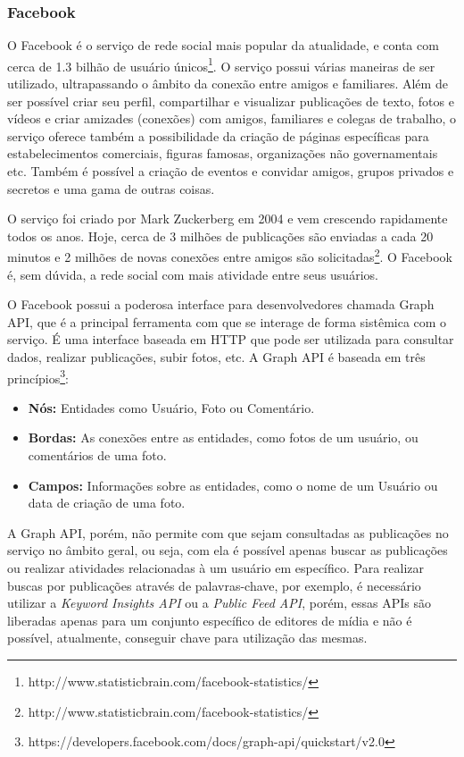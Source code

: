 \subsubsection*{Facebook}

O Facebook é o serviço de rede social mais popular da atualidade, e conta com cerca de 1.3 bilhão de usuário únicos\footnote{http://www.statisticbrain.com/facebook-statistics/}. O serviço possui várias maneiras de ser utilizado, ultrapassando o âmbito da conexão entre amigos e familiares. Além de ser possível criar seu perfil, compartilhar e visualizar publicações de texto, fotos e vídeos e criar amizades (conexões) com amigos, familiares e colegas de trabalho, o serviço oferece também a possibilidade da criação de páginas específicas para estabelecimentos comerciais, figuras famosas, organizações não governamentais etc. Também é possível a criação de eventos e convidar amigos, grupos privados e secretos e uma gama de outras coisas.

O serviço foi criado por Mark Zuckerberg em 2004 e vem crescendo rapidamente todos os anos. Hoje, cerca de 3 milhões de publicações são enviadas a cada 20 minutos e 2 milhões de novas conexões entre amigos são solicitadas\footnote{http://www.statisticbrain.com/facebook-statistics/}. O Facebook é, sem dúvida, a rede social com mais atividade entre seus usuários.

O Facebook possui a poderosa interface para desenvolvedores chamada Graph API, que é a principal ferramenta com que se interage de forma sistêmica com o serviço. É uma interface baseada em HTTP que pode ser utilizada para consultar dados, realizar publicações, subir fotos, etc. A Graph API é baseada em três princípios\footnote{https://developers.facebook.com/docs/graph-api/quickstart/v2.0}:

\begin{itemize}
	\item \textbf{Nós:} Entidades como Usuário, Foto ou Comentário.
	\item \textbf{Bordas:} As conexões entre as entidades, como fotos de um usuário, ou comentários de uma foto.
	\item \textbf{Campos:} Informações sobre as entidades, como o nome de um Usuário ou data de criação de uma foto.
\end{itemize}

A Graph API, porém, não permite com que sejam consultadas as publicações no serviço no âmbito geral, ou seja, com ela é possível apenas buscar as publicações ou realizar atividades relacionadas à um usuário em específico. Para realizar buscas por publicações através de palavras-chave, por exemplo, é necessário utilizar a \textit{Keyword Insights API} ou a \textit{Public Feed API}, porém, essas APIs são liberadas apenas para um conjunto específico de editores de mídia e não é possível, atualmente, conseguir chave para utilização das mesmas.

